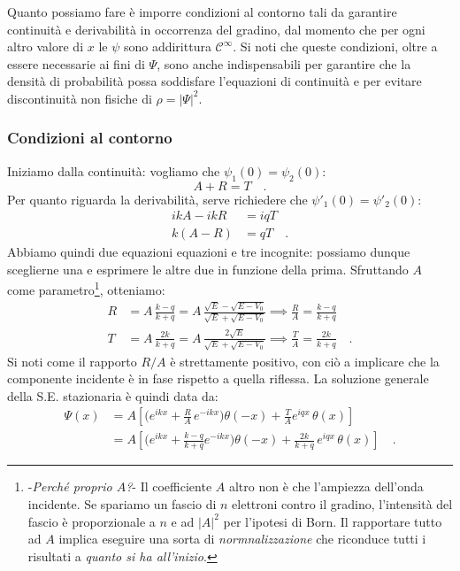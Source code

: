 Quanto possiamo fare è imporre condizioni al contorno tali da garantire continuità e derivabilità in occorrenza del gradino, dal momento che per ogni altro valore di $x$ le $\psi$ sono addirittura $\mathcal{C}^\infty$. Si noti che queste condizioni, oltre a essere necessarie ai fini di $\Psi$, sono anche indispensabili per garantire che la densità di probabilità possa soddisfare l'equazioni di continuità e per evitare discontinuità non fisiche di $\rho = |\Psi|^2$.

\subsubsection{Condizioni al contorno}
Iniziamo dalla continuità: vogliamo che $\psi_1(0) = \psi_2(0)$:
\[
    A + R = T \quad.
\]  
Per quanto riguarda la derivabilità, serve richiedere che $\psi'_1(0) = \psi'_2(0)$:
\[
    \begin{aligned}
        ik A - ik R &= iqT \\
        k(A-R) &= qT \quad.
    \end{aligned}
\]
Abbiamo quindi due equazioni equazioni e tre incognite: possiamo dunque sceglierne una e esprimere le altre due in funzione della prima. Sfruttando $A$ come parametro\footnote{-\emph{Perché proprio $A$?}- Il coefficiente $A$ altro non è che l'ampiezza dell'onda incidente. Se spariamo un fascio di $n$ elettroni contro il gradino, l'intensità del fascio è proporzionale a $n$ e ad $|A|^2$ per l'ipotesi di Born. Il rapportare tutto ad $A$ implica eseguire una sorta di \emph{normnalizzazione} che riconduce tutti i risultati a \emph{quanto si ha all'inizio}.}, otteniamo:
\begin{equation}
\begin{aligned}
    R &= A \, \frac{k-q}{k+q} = A \, \frac{\sqrt{E}-\sqrt{E-V_0}}{\sqrt{E}+\sqrt{E-V_0}} \implies \frac{R}{A} = \frac{k-q}{k+q}\\
    T &= A\, \frac{2k}{k+q} = A \, \frac{2\sqrt{E}}{\sqrt{E}+\sqrt{E-V_0}} \implies \frac{T}{A} = \frac{2k}{k+q} \quad.
\end{aligned}
\label{eq:RA}
\end{equation}
Si noti come il rapporto $R/A$ è strettamente positivo, con ciò a implicare che la componente incidente è in fase rispetto a quella riflessa. La soluzione generale della S.E. stazionaria è quindi data da:
\[
\begin{aligned}
        \Psi(x) &= A \left[ \bigg(e^{ikx} + \frac{R}{A} \,e^{-ikx}\bigg)\theta(-x) + \frac{T}{A}e^{iqx}\,\theta(x) \right] \\
        &= A \left[ \bigg(e^{ikx} + \frac{k-q}{k+q}e^{-ikx}\bigg)\theta(-x) + \frac{2k}{k+q} \,e^{iqx}\,\theta(x) \right] \quad.
\end{aligned}
\]

